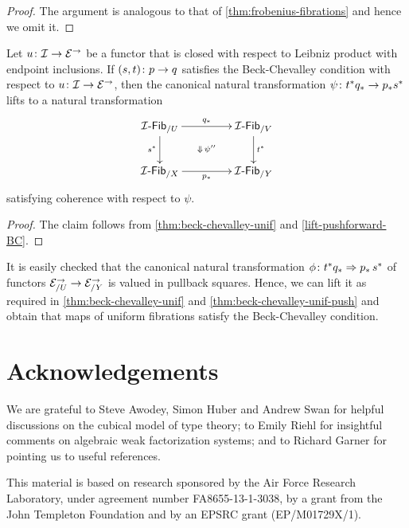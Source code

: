 \documentclass[reqno,10pt,a4paper,oneside]{amsart}
\begin{document}
\begin{proof} The argument is analogous to that of \cref{thm:frobenius-fibrations} and hence we omit it.
\end{proof}


\begin{corollary} \label{thm:beck-chevalley-unif-push}
Let $u \colon \mathcal{I} \to \mathcal{E}^\to$ be a functor that is closed with respect to Leibniz product with endpoint inclusions.
If $(s,t) \colon p \to q$ satisfies the Beck-Chevalley condition with respect to $u \colon \mathcal{I} \to \mathcal{E}^\to$, then the canonical natural transformation $\psi \colon t^* q_* \to p_* s^*$ lifts to a natural transformation
\[
\xymatrix@C+2em{
  \Fib{\cal{I}}_{/U}
  \ar[r]^{q_*}
  \ar[d]_{s^*}
  \ar@{}[dr]|{\Downarrow \, \psi''}
&
  \Fib{\cal{I}}_{/V}
  \ar[d]^{t^*}
\\
  \Fib{\cal{I}}_{/X}
  \ar[r]_{p_*}
&
  \Fib{\cal{I}}_{/Y}
}
\]
satisfying coherence with respect to $\psi$.
\end{corollary}


\begin{proof} The claim follows from \cref{thm:beck-chevalley-unif} and \cref{lift-pushforward-BC}.
\end{proof}


\begin{example}
It is easily checked that the canonical natural transformation $\phi \colon t^* q_* \Rightarrow p_* \, s^*$ of functors $\mathcal{E}_{/U}^\to \to \mathcal{E}_{/Y}^\to$ is valued in pullback squares.
Hence, we can lift it as required in \cref{thm:beck-chevalley-unif} and \cref{thm:beck-chevalley-unif-push} and obtain that maps of uniform fibrations satisfy the Beck-Chevalley condition.
\end{example}

\section*{Acknowledgements}

We are grateful to Steve Awodey, Simon Huber and Andrew Swan for helpful discussions on the cubical model of type theory; to Emily Riehl for insightful comments on algebraic weak factorization systems; and to Richard Garner for pointing us to useful references.

This material is based on research sponsored by the Air Force Research Laboratory, under agreement number FA8655-13-1-3038, by a grant from the John Templeton Foundation and by an EPSRC grant (EP/M01729X/1).
\end{document}
